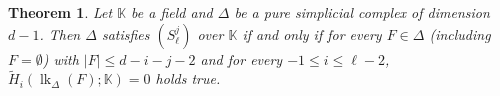 \documentclass[11pt]{amsart}
\numberwithin{equation}{section}
\newtheorem{theorem}{Theorem}[section]
\theoremstyle{definition}
\newtheorem{remark}[theorem]{Remark}
\theoremstyle{remark}
\newcommand{\lk}{\operatorname{lk}}
\begin{document}

\begin{theorem}
Let $\mathbb{K}$ be a field and $\Delta$ be a pure simplicial complex of dimension $d - 1$. Then $\Delta$ satisfies $(S_\ell^j)$ over
$\mathbb{K}$ if and only if for every $F \in \Delta$ (including $F = \emptyset$) with $|F| \leq d-i-j-2$ and for every $-1\leq i \leq \ell-2$, $\tilde{H}_i(\lk_{\Delta}(F);\mathbb{K}) = 0$ holds true.
\end{theorem}
\end{document}
